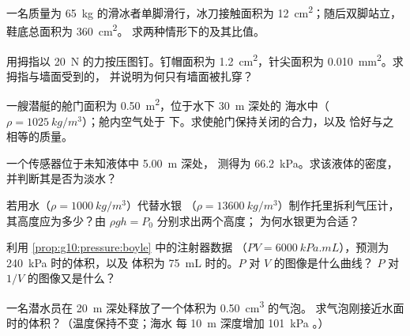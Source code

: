 \begin{exercise}[$\star$]\label{exo:g10:pressure:5}
一名质量为 \qty{65}{kg} 的滑冰者单脚滑行，冰刀接触面积为
\qty{12}{cm^2}；随后双脚站立，鞋底总面积为 \qty{360}{cm^2}。
求两种情形下的及其比值。
\end{exercise}

\begin{exercise}[$\star\star$]\label{exo:g10:pressure:6}
用拇指以 \qty{20}{N} 的力按压图钉。钉帽面积为
\qty{1.2}{cm^2}，针尖面积为 \qty{0.010}{mm^2}。求拇指与墙面受到的，
并说明为何只有墙面被扎穿？
\end{exercise}

\begin{exercise}[$\star\star$]\label{exo:g10:pressure:7}
一艘潜艇的舱门面积为 \qty{0.50}{m^2}，位于水下 \qty{30}{m} 深处的
海水中（$\rho = \qty{1025}{kg/m^3}$）；舱内空气处于
下。求使舱门保持关闭的合力，以及
恰好与之相等的质量。
\end{exercise}

\begin{exercise}[$\star\star$]\label{exo:g10:pressure:8}
一个传感器位于未知液体中 \qty{5.00}{m} 深处，
测得为 \qty{66.2}{kPa}。求该液体的密度，并判断其是否为淡水？
\end{exercise}

\begin{exercise}[$\star\star$]\label{exo:g10:pressure:9}
若用水（$\rho = \qty{1000}{kg/m^3}$）代替水银
（$\rho = \qty{13600}{kg/m^3}$）制作托里拆利气压计，
其高度应为多少？由 $\rho g h = P_0$ 分别求出两个高度；
为何水银更为合适？
\end{exercise}

\begin{exercise}[$\star\star$]\label{exo:g10:pressure:10}
利用 \cref{prop:g10:pressure:boyle} 中的注射器数据
（$PV = \qty{6000}{kPa.mL}$），预测为 \qty{240}{kPa} 时的体积，以及
体积为 \qty{75}{mL} 时的。$P$ 对 $V$ 的图像是什么曲线？
$P$ 对 $1/V$ 的图像又是什么？
\end{exercise}

\begin{exercise}[$\star\star$]\label{exo:g10:pressure:11}
一名潜水员在 \qty{20}{m} 深处释放了一个体积为 \qty{0.50}{cm^3} 的气泡。
求气泡刚接近水面时的体积？（温度保持不变；海水
每 \qty{10}{m} 深度增加 \qty{101}{kPa} 。）
\end{exercise}

